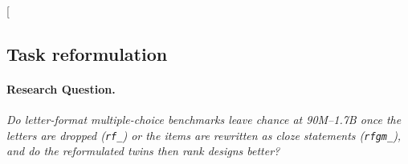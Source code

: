 \clearpage
\twocolumn[{%
\rqparent
\subsection{Task reformulation}
\label{app:rq00_task_reformulation}

\noindent\begin{minipage}[t]{0.485\textwidth}
\vspace{0pt}
\paragraph{Research Question.} \emph{Do letter-format multiple-choice benchmarks leave chance at 90M--1.7B once the letters are dropped (\texttt{rf\_}) or the items are rewritten as cloze statements (\texttt{rfgm\_}), and do the reformulated twins then rank designs better?}


\end{minipage}}
